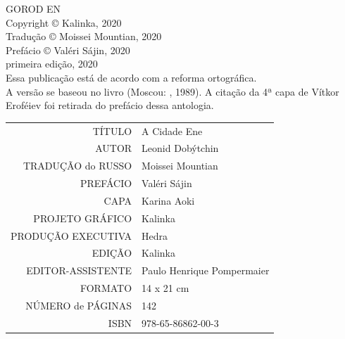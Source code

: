 \newpage
\pagestyle{empty}
\MyriadPro
\scriptsize
\begin{center}
GOROD EN\\[6pt]

Copyright © Kalinka, 2020\\[6pt]

Tradução © Moissei Mountian, 2020\\[6pt]

Prefácio © Valéri Sájin, 2020\\[6pt]

primeira edição, 2020\\[40pt]


Essa publicação está de acordo com a reforma ortográfica.\\[6pt]
A versão se baseou no livro {} (Moscou: {}, 1989). A citação da 4ª capa de Vítkor Eroféiev foi retirada do prefácio dessa antologia.\\[6pt]	
\end{center}


\bigskip

\begin{vplace}[1]
\begin{table}[ht!]
\centering
\MyriadPro\itshape
\scriptsize
\begin{tabular}{rl}
TÍTULO            & A Cidade Ene 									   \\[2pt]
AUTOR             & Leonid Dobýtchin                          		   \\[2pt]
TRADUÇÃO do RUSSO & Moissei Mountian 				                   \\[2pt]
PREFÁCIO          & Valéri Sájin	                                   \\[2pt]
CAPA              & Karina Aoki		                                   \\[2pt]
PROJETO GRÁFICO   & Kalinka                                            \\[2pt]
PRODUÇÃO EXECUTIVA & Hedra                                             \\[2pt]
EDIÇÃO            & Kalinka 		                                   \\[2pt] 
EDITOR-ASSISTENTE & Paulo Henrique Pompermaier                         \\[2pt] 
FORMATO           & 14 x 21 cm                                         \\[2pt]
NÚMERO de PÁGINAS & 142                                                \\[2pt]
ISBN              & 978-65-86862-00-3                                 
\end{tabular}
\end{table}
\end{vplace}

